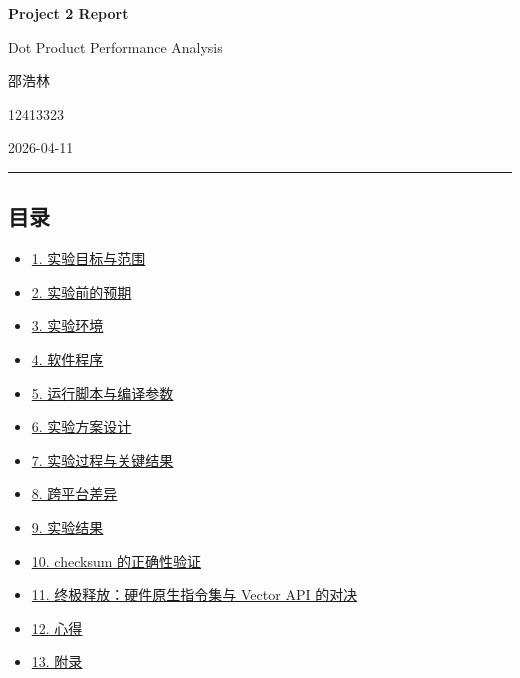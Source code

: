 \documentclass[12pt,fontset=none]{ctexart}
\providecommand{\tightlist}{%
  \setlength{\itemsep}{0pt}\setlength{\parskip}{0pt}}
\begin{document}
\begin{titlepage}
    \centering
    \vspace*{0.22\textheight}
    {\fontsize{32}{40}\selectfont\bfseries\color{heading}Project 2 Report\par}
    \vspace{1.0em}
    {\fontsize{16}{22}\selectfont\color{text}Dot Product Performance Analysis\par}
    \vspace{6em}
    {\Large\color{text}邵浩林\par}
    \vspace{0.8em}
    {\large\color{text}12413323\par}
    \vfill
    {\large\color{text}2026-04-11\par}
\end{titlepage}

\begin{center}\rule{0.5\linewidth}{0.5pt}\end{center}

\subsection{目录}\label{ux76eeux5f55}

\begin{itemize}
\tightlist
\item
  \hyperref[1-ux5b9eux9a8cux76eeux6807ux4e0eux8303ux56f4]{1.
  实验目标与范围}
\item
  \hyperref[2-ux5b9eux9a8cux524dux7684ux9884ux671f]{2. 实验前的预期}
\item
  \hyperref[3-ux5b9eux9a8cux73afux5883]{3. 实验环境}
\item
  \hyperref[4-ux8f6fux4ef6ux7a0bux5e8f]{4. 软件程序}
\item
  \hyperref[5-ux8fd0ux884cux811aux672cux4e0eux7f16ux8bd1ux53c2ux6570]{5.
  运行脚本与编译参数}
\item
  \hyperref[6-ux5b9eux9a8cux65b9ux6848ux8bbeux8ba1]{6. 实验方案设计}
\item
  \hyperref[7-ux5b9eux9a8cux8fc7ux7a0bux4e0eux5173ux952eux7ed3ux679c]{7.
  实验过程与关键结果}
\item
  \hyperref[8-ux8de8ux5e73ux53f0ux5deeux5f02]{8. 跨平台差异}
\item
  \hyperref[9-ux5b9eux9a8cux7ed3ux679c]{9. 实验结果}
\item
  \hyperref[10-checksum-ux7684ux6b63ux786eux6027ux9a8cux8bc1]{10.
  checksum 的正确性验证}
\item
  \hyperref[11-ux7ec8ux6781ux91caux653eux786cux4ef6ux539fux751fux6307ux4ee4ux96c6ux4e0e-vector-api-ux7684ux5bf9ux51b3]{11.
  终极释放：硬件原生指令集与 Vector API 的对决}
\item
  \hyperref[12-ux5fc3ux5f97]{12. 心得}
\item
  \hyperref[13-ux9644ux5f55]{13. 附录}
\end{itemize}
\end{document}
